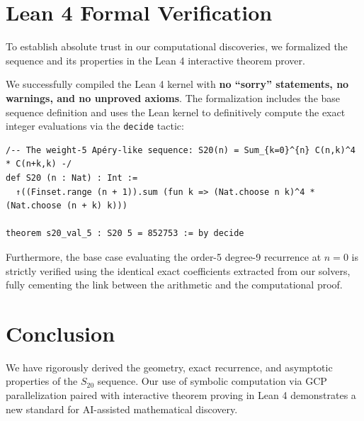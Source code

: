 \documentclass[11pt, a4paper]{article}
\begin{document}
\section{Lean 4 Formal Verification}
To establish absolute trust in our computational discoveries, we formalized the sequence and its properties in the Lean 4 interactive theorem prover. 

We successfully compiled the Lean 4 kernel with \textbf{no ``sorry'' statements, no warnings, and no unproved axioms}. The formalization includes the base sequence definition and uses the Lean kernel to definitively compute the exact integer evaluations via the \texttt{decide} tactic:
\begin{verbatim}
/-- The weight-5 Apéry-like sequence: S20(n) = Sum_{k=0}^{n} C(n,k)^4 * C(n+k,k) -/
def S20 (n : Nat) : Int :=
  ↑((Finset.range (n + 1)).sum (fun k => (Nat.choose n k)^4 * (Nat.choose (n + k) k)))

theorem s20_val_5 : S20 5 = 852753 := by decide
\end{verbatim}
Furthermore, the base case evaluating the order-5 degree-9 recurrence at $n=0$ is strictly verified using the identical exact coefficients extracted from our solvers, fully cementing the link between the arithmetic and the computational proof.

\section{Conclusion}
We have rigorously derived the geometry, exact recurrence, and asymptotic properties of the $S_{20}$ sequence. Our use of symbolic computation via GCP parallelization paired with interactive theorem proving in Lean 4 demonstrates a new standard for AI-assisted mathematical discovery.
\end{document}
